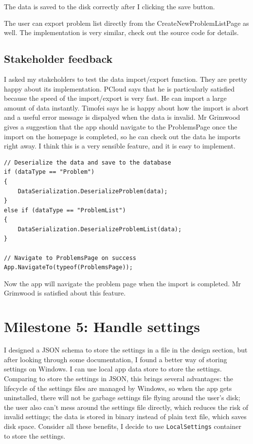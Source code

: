 \documentclass[a4paper]{report}
\newcommand{\code}{\texttt}
\begin{document}
The data is saved to the disk correctly after I clicking the save button.

The user can export problem list directly from the CreateNewProblemListPage as well. The implementation is very similar, check out the source code for details.

\subsection{Stakeholder feedback}

I asked my stakeholders to test the data import/export function. They are pretty happy about its implementation. PCloud says that he is particularly satisfied because the speed of the import/export is very fast. He can import a large amount of data instantly. Timofei says he is happy about how the import is abort and a useful error message is dispalyed when the data is invalid. Mr Grimwood gives a suggestion that the app should navigate to the ProblemsPage once the import on the homepage is completed, so he can check out the data he imports right away. I think this is a very sensible feature, and it is easy to implement.

\begin{verbatim}
// Deserialize the data and save to the database
if (dataType == "Problem")
{
    DataSerialization.DeserializeProblem(data);
}
else if (dataType == "ProblemList")
{
    DataSerialization.DeserializeProblemList(data);
}

// Navigate to ProblemsPage on success
App.NavigateTo(typeof(ProblemsPage));
\end{verbatim}

Now the app will navigate the problem page when the import is completed. Mr Grimwood is satisfied about this feature.

\section{Milestone 5: Handle settings}

I designed a JSON schema to store the settings in a file in the design section, but after looking through some documentation, I found a better way of storing settings on Windows. I can use local app data store\cite{microsoft:docs:store-and-retrieve-app-data} to store the settings. Comparing to store the settings in JSON, this brings several advantages: the lifecycle of the settings files are managed by Windows, so when the app gets uninstalled, there will not be garbage settings file flying around the user's disk; the user also can't mess around the settings file directly, which reduces the risk of invalid settings; the data is stored in binary instead of plain text file, which saves disk space. Consider all these benefits, I decide to use \code{LocalSettings} container to store the settings.
\end{document}
